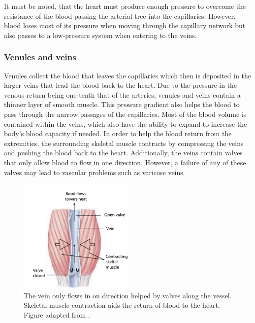 It must be noted, that the heart must produce enough pressure to overcome the resistance of the blood passing the arterial tree into the capillaries. However, blood loses most of its pressure when moving through the capillary network but also passes to a low-pressure system when entering to the veins. 

\subsubsection{Venules and veins}
Venules collect the blood that leaves the capillaries which then is deposited in the larger veins that lead the blood back to the heart. Due to the pressure in the venous return being one-tenth that of the arteries, venules and veins contain a thinner layer of smooth muscle. This pressure gradient also helps the blood to pass through the narrow passages of the capillaries. Most of the blood volume is contained within the veins, which also have the ability to expand to increase the body's blood capacity if needed. In order to help the blood return from the extremities, the surrounding skeletal muscle contracts by compressing the veins and pushing the blood back to the heart. Additionally, the veins contain valves that only allow blood to flow in one direction. However, a failure of any of these valves may lead to vascular problems such as varicose veins. 

\begin{figure}[!htpb]
	\centering
	\includegraphics[width=0.5\textwidth,keepaspectratio]{figure2}    
	\caption[Venous return through skeletal muscle]{The vein only flows in on direction helped by valves along the vessel. Skeletal muscle contraction aids the return of blood to the heart. Figure adapted from \cite{johnson2001biology}. }
	\label{fig:venous return}
\end{figure}

